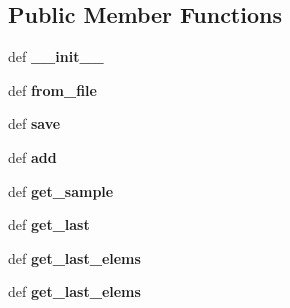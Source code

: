 \subsection*{Public Member Functions}
\begin{DoxyCompactItemize}
\item 
\hypertarget{classaml__io_1_1data__manager_1_1_data_manager_aeb6c604e9dd3456df03278d91fc2700a}{def {\bfseries \-\_\-\-\_\-init\-\_\-\-\_\-}}\label{classaml__io_1_1data__manager_1_1_data_manager_aeb6c604e9dd3456df03278d91fc2700a}

\item 
\hypertarget{classaml__io_1_1data__manager_1_1_data_manager_a91fff6172edba42befc8265e7e05978e}{def {\bfseries from\-\_\-file}}\label{classaml__io_1_1data__manager_1_1_data_manager_a91fff6172edba42befc8265e7e05978e}

\item 
\hypertarget{classaml__io_1_1data__manager_1_1_data_manager_a0a8a72dd43ceb33792d852a7ce7ccffc}{def {\bfseries save}}\label{classaml__io_1_1data__manager_1_1_data_manager_a0a8a72dd43ceb33792d852a7ce7ccffc}

\item 
\hypertarget{classaml__io_1_1data__manager_1_1_data_manager_addc0734f831fa8945957a5874d775cfa}{def {\bfseries add}}\label{classaml__io_1_1data__manager_1_1_data_manager_addc0734f831fa8945957a5874d775cfa}

\item 
\hypertarget{classaml__io_1_1data__manager_1_1_data_manager_a483cbe93fd3b29eaa66c513c6f821291}{def {\bfseries get\-\_\-sample}}\label{classaml__io_1_1data__manager_1_1_data_manager_a483cbe93fd3b29eaa66c513c6f821291}

\item 
\hypertarget{classaml__io_1_1data__manager_1_1_data_manager_a7fc8cd640ebb497cadd9c6437b8a312d}{def {\bfseries get\-\_\-last}}\label{classaml__io_1_1data__manager_1_1_data_manager_a7fc8cd640ebb497cadd9c6437b8a312d}

\item 
\hypertarget{classaml__io_1_1data__manager_1_1_data_manager_ab1d05e89db12d15f7e0e0d705df1a59c}{def {\bfseries get\-\_\-last\-\_\-elems}}\label{classaml__io_1_1data__manager_1_1_data_manager_ab1d05e89db12d15f7e0e0d705df1a59c}

\item 
\hypertarget{classaml__io_1_1data__manager_1_1_data_manager_ab1d05e89db12d15f7e0e0d705df1a59c}{def {\bfseries get\-\_\-last\-\_\-elems}}\label{classaml__io_1_1data__manager_1_1_data_manager_ab1d05e89db12d15f7e0e0d705df1a59c}


\end{DoxyCompactItemize}
